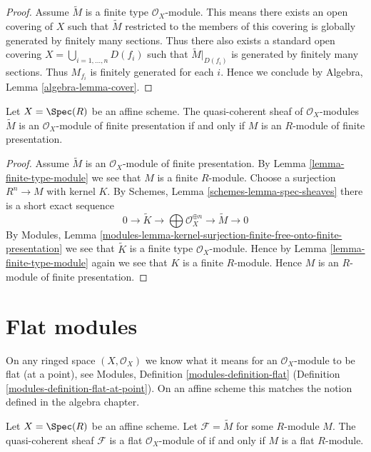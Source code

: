 \begin{proof}
Assume $\widetilde M$ is a finite type $\mathcal{O}_X$-module.
This means there exists an open covering of $X$ such that
$\widetilde M$ restricted to the members of this covering is
globally generated by finitely many sections.
Thus there also exists a standard open covering
$X = \bigcup_{i = 1, \ldots, n} D(f_i)$ such that $\widetilde M|_{D(f_i)}$
is generated by finitely many sections. Thus $M_{f_i}$ is finitely
generated for each $i$. Hence we conclude by
Algebra, Lemma \ref{algebra-lemma-cover}.
\end{proof}

\begin{lemma}
\label{lemma-finite-presentation-module}
Let $X = \Spec(R)$ be an affine scheme. The quasi-coherent sheaf
of $\mathcal{O}_X$-modules $\widetilde M$ is an $\mathcal{O}_X$-module of
finite presentation if and only if $M$ is an $R$-module of finite presentation.
\end{lemma}

\begin{proof}
Assume $\widetilde M$ is an $\mathcal{O}_X$-module of finite presentation.
By Lemma \ref{lemma-finite-type-module} we see that $M$ is a finite $R$-module.
Choose a surjection $R^n \to M$ with kernel $K$. By
Schemes, Lemma \ref{schemes-lemma-spec-sheaves}
there is a short exact sequence
$$
0 \to \widetilde{K} \to
\bigoplus \mathcal{O}_X^{\oplus n} \to
\widetilde{M} \to 0
$$
By
Modules, Lemma
\ref{modules-lemma-kernel-surjection-finite-free-onto-finite-presentation}
we see that $\widetilde{K}$ is a finite type $\mathcal{O}_X$-module.
Hence by Lemma \ref{lemma-finite-type-module}
again we see that $K$ is a finite $R$-module.
Hence $M$ is an $R$-module of finite presentation.
\end{proof}



\section{Flat modules}
\label{section-flat}

\noindent
On any ringed space $(X, \mathcal{O}_X)$
we know what it means for an $\mathcal{O}_X$-module
to be flat (at a point), see
Modules, Definition \ref{modules-definition-flat}
(Definition \ref{modules-definition-flat-at-point}).
On an affine scheme this matches the notion
defined in the algebra chapter.

\begin{lemma}
\label{lemma-flat-module}
Let $X = \Spec(R)$ be an affine scheme.
Let $\mathcal{F} = \widetilde{M}$ for some $R$-module $M$.
The quasi-coherent sheaf $\mathcal{F}$ is a flat
$\mathcal{O}_X$-module of if and only if $M$ is a flat $R$-module.
\end{lemma}

